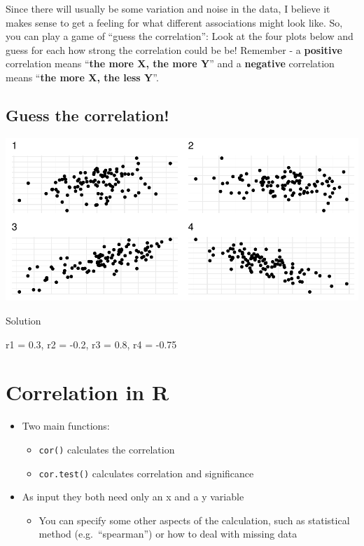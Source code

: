 \documentclass[
]{book}
\providecommand{\tightlist}{%
  \setlength{\itemsep}{0pt}\setlength{\parskip}{0pt}}
\begin{document}
Since there will usually be some variation and noise in the data, I believe it makes sense to get a feeling for what different associations might look like.
So, you can play a game of ``guess the correlation'': Look at the four plots below and guess for each how strong the correlation could be be!
Remember - a \textbf{positive} correlation means ``\textbf{the more X, the more Y}'' and a \textbf{negative} correlation means ``\textbf{the more X, the less Y}''.

\subsection{Guess the correlation!}\label{guess-the-correlation}

\includegraphics{_main_files/figure-html/corr1-1.pdf}

Solution

r1 = 0.3, r2 = -0.2, r3 = 0.8, r4 = -0.75

\section{Correlation in R}\label{correlation-in-r}

\begin{itemize}
\tightlist
\item
  Two main functions:

  \begin{itemize}
  \tightlist
  \item
    \texttt{cor()} calculates the correlation
  \item
    \texttt{cor.test()} calculates correlation and significance
  \end{itemize}
\item
  As input they both need only an x and a y variable

  \begin{itemize}
  \tightlist
  \item
    You can specify some other aspects of the calculation, such as statistical method (e.g.~``spearman'') or how to deal with missing data
  \end{itemize}
\end{itemize}
\end{document}
